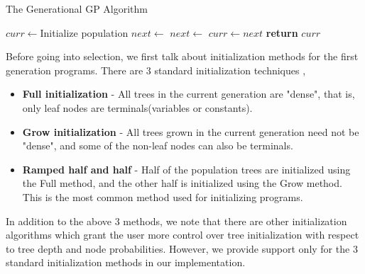 \begin{algorithm}
  \caption{The Generational GP Algorithm}\label{gpalgo}
  \begin{algorithmic}[1]
  \State $curr \gets $Initialize population  
  \State {} 
  \Repeat
  \State $next \gets $ 
  \State $next \gets $  
  \State {}
  \State $curr \gets next$
  \label{gpalgoendloop}
  \State \textbf{return} $curr$
  \EndProcedure
  \end{algorithmic}
\end{algorithm}

Before going into selection, we first talk about initialization methods for the first generation programs. There are $3$ standard initialization techniques \citep{Koza92},\citep{luke:2000:2ftcaGP}
\begin{itemize}
    \item \textbf{Full initialization} - All trees in the current generation are "dense", that is, only leaf nodes are terminals(variables or constants).
    \item \textbf{Grow initialization} - All trees grown in the current generation need not be "dense", and some of the non-leaf nodes can also be terminals. 
    \item \textbf{Ramped half and half} - Half of the population trees are initialized using the Full method, and the other half is initialized using the Grow method. This is the most common method used for initializing programs.
\end{itemize}

In addition to the above $3$ methods, we note that there are other initialization algorithms which grant the user more control over tree initialization with respect to tree depth and node probabilities\citep{luke:2000:2ftcaGP}.
However, we provide support only for the $3$ standard initialization methods in our implementation.

